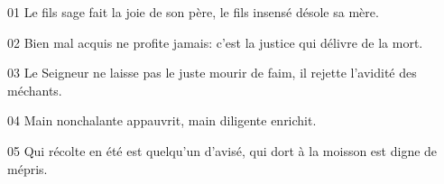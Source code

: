 01 Le fils sage fait la joie de son père, le fils insensé désole sa mère.

02 Bien mal acquis ne profite jamais: c’est la justice qui délivre de la mort.

03 Le Seigneur ne laisse pas le juste mourir de faim, il rejette l’avidité des méchants.

04 Main nonchalante appauvrit, main diligente enrichit.

05 Qui récolte en été est quelqu’un d’avisé, qui dort à la moisson est digne de mépris.
